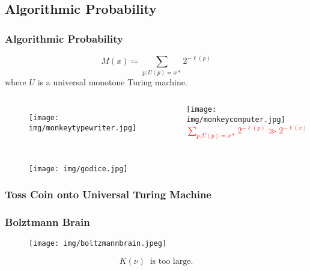 \documentclass[UTF8,11pt,colorlinks,compress,openany]{beamer}%
\begin{document}
\subsection{Algorithmic Probability}

\begin{frame}\frametitle{Algorithmic Probability}
	\begin{definition}
		\[M(x)\coloneqq \sum\limits_{p:U(p)=x*}2^{-\ell(p)}\]
		where $U$ is a universal monotone Turing machine.
	\end{definition}
	\begin{columns}[onlytextwidth]
			\begin{figure}
				\texttt{[image: img/monkeytypewriter.jpg]}
			\end{figure}
			\texttt{[image: img/monkeycomputer.jpg]}\\
			\centering\textcolor{red}{\scriptsize{$\sum\limits_{p:U(p)=x*}2^{-\ell(p)}\gg 2^{-\ell(x)}$}}
	\end{columns}
\end{frame}

\begin{frame}\frametitle{}
\begin{figure}
	\texttt{[image: img/godice.jpg]}
\end{figure}
\end{frame}

\begin{frame}\frametitle{Toss Coin onto Universal Turing Machine}
	\begin{figure}[htb]
	\end{figure}
\end{frame}

\begin{frame}\frametitle{Bolztmann Brain}
\begin{figure}
	\texttt{[image: img/boltzmannbrain.jpeg]}
\end{figure}
\[K(\nu)\;\;\text{is too large}.\]
\end{frame}
\end{document}
